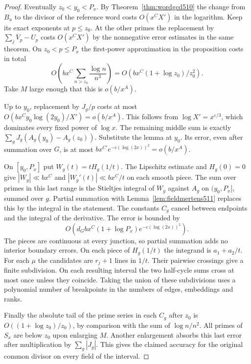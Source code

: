 \documentclass[a4paper,11pt]{article}
\theoremstyle{definition}
\theoremstyle{remark}
\numberwithin{equation}{section}
\begin{document}
\begin{proof}
Eventually \(z_0<y_0<P_x\). By Theorem~\ref{thm:wordgcd510}
the change from \(B_u\) to the divisor of the reference word
costs \(O(x^C X')\) in the logarithm. Keep its exact exponents
at \(p\le z_0\). At the other primes the replacement by
\(\sum_j\overline V_p-U_p\) costs \(O(x^C X')\) by the
nonnegative error estimates in the same theorem. On
\(z_0<p\le P_x\) the first-power approximation in the
proposition costs in total
\[
    O\!\left(bx^C\sum_{n>z_0}\frac{\log n}{n^3}\right)
                  = O\!\left(bx^C(1+\log z_0)/z_0^2\right).
\]
Take \(M\) large enough that this is \(o(b/x^A)\).

Up to \(y_0\), replacement by \(J_g/p\) costs at most
\(O(bx^C y_0\log(2y_0)/X')=o(b/x^A)\). This follows from
\(\log X'=x^{\varepsilon/3}\), which dominates every fixed
power of \(\log x\). The remaining middle sum is exactly
\(\sum_g J_g(A_g(y_0)-A_g(z_0))\). Substitute the lemma at
\(y_0\). Its error, even after summation over \(G\), is at
most \(bx^{C'}e^{-c(\log(2x))^2}=o(b/x^A)\).

On \([y_0,P_x]\) put \(W_g(t)=tH_g(1/t)\). The Lipschitz
estimate and \(H_g(0)=0\) give \(|W_g|\ll bx^C\) and
\(|W_g'(t)|\ll bx^C/t\) on each smooth piece. The sum over
primes in this last range is the Stieltjes integral of
\(W_g\) against \(A_g\) on \((y_0,P_x]\), summed over \(g\).
Partial summation with Lemma~\ref{lem:fieldmertens511} replaces
this by the integral in the statement. The constants \(C_g\)
cancel between endpoints and the integral of the derivative.
The error is bounded by
\[
       O\!\left(d_G bx^C(1+\log P_x)
                               e^{-c(\log(2x))^2}\right).
\]
The pieces are continuous at every junction, so partial
summation adds no interior boundary errors. On each piece of
\(H_g(1/t)\) the integrand is \(a_1+a_2/t\). For each
\(\mu\) the candidates are \(r_j+1\) lines in \(1/t\).
Their pairwise crossings give a finite subdivision. On each
resulting interval the two half-cycle sums cross at most once
unless they coincide. Taking the union of these subdivisions
uses a polynomial number of breakpoints in the numbers of
edges, embeddings and ranks.

Finally the absolute tail of the prime series in each \(C_g\)
after \(z_0\) is \(O((1+\log z_0)/z_0)\), by comparison
with the sum of \(\log n/n^2\). All primes of \(S_x\)
are below \(z_0\) upon enlarging \(M\). Another enlargement
absorbs this last error after multiplication by \(\sum_g|J_g|\).
This gives the claimed accuracy for the original common
divisor on every field of the interval.
\end{proof}
\end{document}
